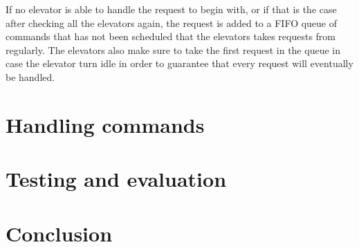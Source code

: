 \documentclass[10pt,a4paper]{article}
\begin{document}
If no elevator is able to handle the request to begin with, or if that is the case after checking all the elevators again, the request is added to a FIFO queue of commands that has not been scheduled that the elevators takes requests from regularly. The elevators also make sure to take the first request in the queue in case the elevator turn idle in order to guarantee that every request will eventually be handled.

\section{Handling commands}

\section{Testing and evaluation}

\section{Conclusion}
\end{document}

